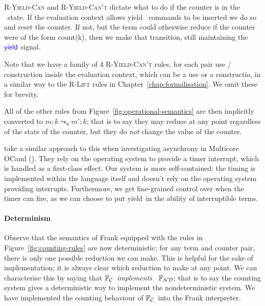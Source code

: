 \documentclass[msc,deptreport,cs]{infthesis} %
\newcommand\nondetfrank{$\mathbb{F}_{\cal{ND}}$}
\newcommand\countingfrank{$\mathbb{F}_{\cal{C}}$}
\newcommand{\justc}[1]{{\color{blue} \textsf{count}({#1})}}
\newcommand{\yieldc}{{\color{blue}{\textsf{yield}}}}
\newcommand\yield{\textsf{yield}\xspace}
\newcommand{\redtou}{\leadsto_{\mathrm{u}}}
\begin{document}
\textsc{R-Yield-Can} and \textsc{R-Yield-Can't} dictate what to do if the
counter is in the \yieldc~state. If the evaluation context allows \yield~
commands to be inserted we do so and reset the counter. If not, but the term
could otherwise reduce if the counter were of the form \justc{k}, then we make
that transition, still maintaining the $\yieldc$ signal.

Note that we have a family of 4 \textsc{R-Yield-Can't} rules, for each pair use
/ construction inside the evaluation context, which can be a use or a
constructio, in a similar way to the \textsc{R-Lift} rules in
Chapter~\ref{chap:formalisation}. We omit these for brevity.

All of the other rules from Figure~\ref{fig:operational-semantics} are then
implicitly converted to $m; k \redtou m'; k$; that is to say they may reduce at
any point regardless of the state of the counter, but they do \emph{not} change
the value of the counter.

\citeauthor{dolan2017concurrent} take a similar approach to this when
investigating asynchrony in Multicore OCaml (\cite{dolan2017concurrent}). They
rely on the operating system to provide a timer interrupt, which is handled as a
first-class effect. Our system is more self-contained; the timing is implemented
within the language itself and doesn't rely on the operating system providing
interrupts. Furthermore, we get fine-grained control over when the timer can
fire, as we can choose to put \yield~in the ability of interruptible
terms.

\paragraph*{Determinism}
Observe that the semantics of Frank equipped with the rules in
Figure~\ref{fig:counting-rules} are now deterministic; for any term and counter
pair, there is only one possible reduction we can make. This is helpful for the
sake of implementation; it is always clear which reduction to make at any
point. We can characterise this by saying that \countingfrank~\emph{implements}~
\nondetfrank; that is to say the counting system gives a deterministic way to
implement the nondeterministic system. We have implemented the counting
behaviour of \countingfrank~into the Frank interpreter.
\end{document}
